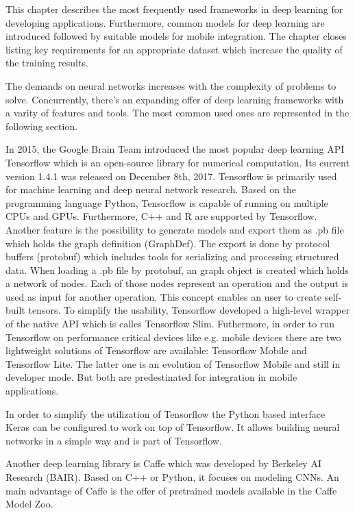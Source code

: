 This chapter describes the most frequently used frameworks in deep learning for developing applications. Furthermore, common models for deep learning are introduced followed by suitable models for mobile integration. The chapter closes listing key requirements for an appropriate dataset which increase the quality of the training results.

The demands on neural networks increases with the complexity of problems to solve. Concurrently, there's an expanding offer of deep learning frameworks with a varity of features and tools. The most common used ones are represented in the following section.

In 2015, the Google Brain Team introduced the most popular deep learning API Tensorflow which is an open-source library for numerical computation. Its current version 1.4.1 was released on December 8th, 2017. Tensorflow is primarily used for machine learning and deep neural network research. Based on the programming language Python, Tensorflow is capable of running on multiple CPUs and GPUs. Furthermore, C++ and R are supported by Tensorflow. Another feature is the possibility to generate models and export them as .pb file which holds the graph definition (GraphDef). The export is done by protocol buffers (protobuf) which includes tools for serializing and processing structured data. When loading a .pb file by protobuf, an graph object is created which holds a network of nodes. Each of those nodes represent an operation and the output is used as input for another operation. This concept enables an user to create self-built tensors. To simplify the usability, Tensorflow developed a high-level wrapper of the native API which is calles Tensorflow Slim. Futhermore, in order to run Tensorflow on performance critical devices like e.g. mobile devices there are two lightweight solutions of Tensorflow are available: Tensorflow Mobile and Tensorflow Lite. The latter one is an evolution of Tensorflow Mobile and still in developer mode. But both are predestinated for integration in mobile applications.

In order to simplify the utilization of Tensorflow the Python based interface Keras can be configured to work on top of Tensorflow. It allows building neural networks in a simple way and is part of Tensorflow.

Another deep learning library is Caffe which was developed by Berkeley AI Research (BAIR). Based on C++ or Python, it focuses on modeling CNNs. An main advantage of Caffe is the offer of pretrained models available in the Caffe Model Zoo. 

